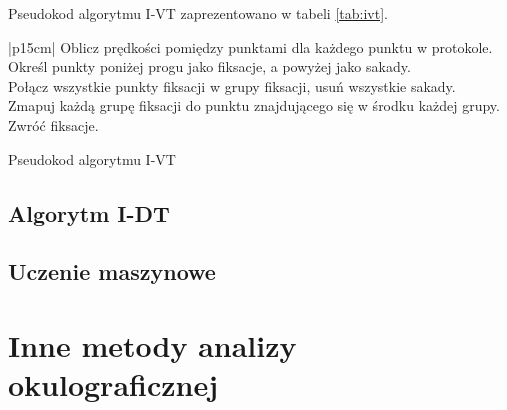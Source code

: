 Pseudokod algorytmu I-VT zaprezentowano w tabeli \ref{tab:ivt}.
\begin{table}[H]
    \begin{tttabular}{|p{15cm}|}
        \hline
        Oblicz prędkości pomiędzy punktami dla każdego punktu w protokole.\\
        \smallskip
        Określ punkty poniżej progu jako fiksacje, a powyżej jako sakady.\\
        \smallskip
        Połącz wszystkie punkty fiksacji w grupy fiksacji, usuń wszystkie sakady.\\
        \smallskip
        Zmapuj każdą grupę fiksacji do punktu znajdującego się w środku każdej grupy.\\
        \smallskip
        Zwróć fiksacje.\\
        \hline
    \end{tttabular}
    \caption{Pseudokod algorytmu I-VT}
    \label{tab:ivt}
\end{table}
\subsection{Algorytm I-DT}
\subsection{Uczenie maszynowe}
\section{Inne metody analizy okulograficznej}